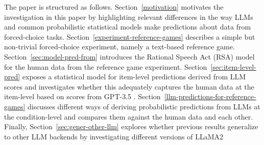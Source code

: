 \documentclass[fleqn]{article}
\begin{document}

The paper is structured as follows.
Section~\ref{motivation} motivates the investigation in this paper by highlighting relevant differences in the way LLMs and common probabilistic statistical models make predictions about data from forced-choice tasks.
Section~\ref{experiment-reference-games} describes a simple but non-trivial forced-choice experiment, namely a text-based reference game.
Section~\ref{sec:model-pred-from} introduces the Rational Speech Act (RSA) model \citep{FrankGoodman2012:Predicting-Prag} for the human data from the reference game experiment.
Section~\ref{sec:item-level-pred} exposes a statistical model for item-level predictions derived from LLM scores and investigates whether this adequately captures the human data at the item-level based on scores from GPT-3.5 \citep{BrownMann2020:Language-Models}.
Section~\ref{llm-predictions-for-reference-games} discusses different ways of deriving probabilistic predictions from LLMs at the condition-level and compares them against the human data and each other.
Finally, Section~\ref{sec:gener-other-llm} explores whether previous results generalize to other LLM backends by investigating different versions of LLaMA2 \citep{TouvronLavril2023:LLaMA:-Open-and}
\end{document}
